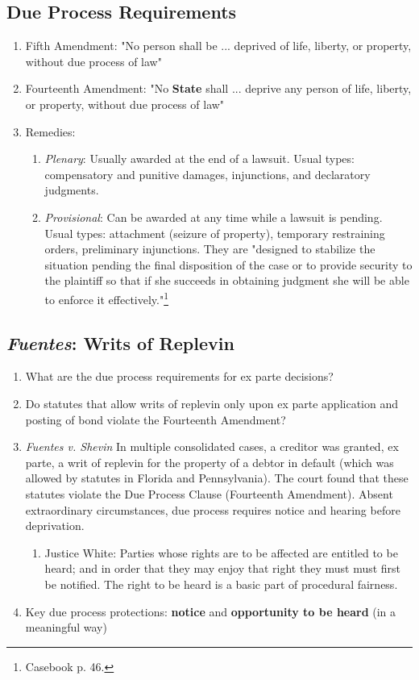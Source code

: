 \subsection{Due Process Requirements}

\begin{enumerate}
    \item Fifth Amendment: "No person shall be ... deprived of life, liberty, or property, without due process of law"
    \item Fourteenth Amendment: "No \textbf{State} shall ... deprive any person of life, liberty, or property, without due process of law"
    \item Remedies:
    \begin{enumerate}
        \item \emph{Plenary}: Usually awarded at the end of a lawsuit. Usual types: compensatory and punitive damages, injunctions, and declaratory judgments.
        \item \emph{Provisional}: Can be awarded at any time while a lawsuit is pending. Usual types: attachment (seizure of property), temporary restraining orders, preliminary injunctions. They are "designed to stabilize the situation pending the final disposition of the case or to provide security to the plaintiff so that if she succeeds in obtaining judgment she will be able to enforce it effectively."\footnote{Casebook p. 46.}
    \end{enumerate}
\end{enumerate}

\subsection{\emph{Fuentes}: Writs of Replevin}

\begin{enumerate}
    \item What are the due process requirements for ex parte decisions?
    \item Do statutes that allow writs of replevin only upon ex parte application and posting of bond violate the Fourteenth Amendment?
    \item \emph{Fuentes v. Shevin} In multiple consolidated cases, a creditor was granted, ex parte, a writ of replevin for the property of a debtor in default (which was allowed by statutes in Florida and Pennsylvania). The court found that these statutes violate the Due Process Clause (Fourteenth Amendment). Absent extraordinary circumstances, due process requires notice and hearing before deprivation.
    \begin{enumerate}
        \item Justice White: Parties whose rights are to be affected are entitled to be heard; and in order that they may enjoy that right they must must first be notified. The right to be heard is a basic part of procedural fairness.
    \end{enumerate}
    \item Key due process protections: \textbf{notice} and \textbf{opportunity to be heard} (in a meaningful way)
\end{enumerate}

